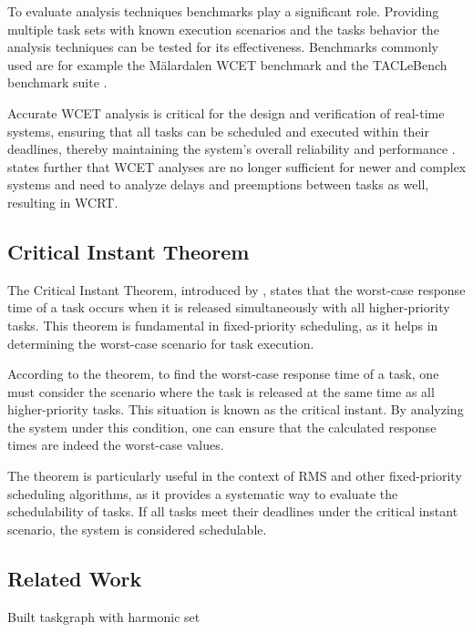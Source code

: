 To evaluate analysis techniques benchmarks play a significant role.
Providing multiple task sets with known execution scenarios and the tasks behavior the analysis techniques can be tested for its effectiveness. 
Benchmarks commonly used are for example the Mälardalen \ac{WCET} benchmark and the TACLeBench benchmark suite \cite{falkTACLeBenchBenchmarkCollection2016}.

Accurate \ac{WCET} analysis is critical for the design and verification of real-time systems, ensuring that all tasks can be scheduled and executed within their deadlines, thereby maintaining the system's overall reliability and performance \cite{kelterWCETAnalysisOptimization}.
\textcite{kelterWCETAnalysisOptimization} states further that \ac{WCET} analyses are no longer sufficient for newer and complex systems and need to analyze delays and preemptions between tasks as well, resulting in \ac{WCRT}.

\subsection{Critical Instant Theorem}
\label{sec:critial_instant_theorem}
The Critical Instant Theorem, introduced by \textcite{liuSchedulingAlgorithmsMultiprogramming1973}, states that the worst-case response time of a task occurs when it is released simultaneously with all higher-priority tasks.
This theorem is fundamental in fixed-priority scheduling, as it helps in determining the worst-case scenario for task execution.

According to the theorem, to find the worst-case response time of a task, one must consider the scenario where the task is released at the same time as all higher-priority tasks. 
This situation is known as the critical instant. By analyzing the system under this condition, one can ensure that the calculated response times are indeed the worst-case values.

The theorem is particularly useful in the context of \ac{RMS} and other fixed-priority scheduling algorithms, as it provides a systematic way to evaluate the schedulability of tasks. 
If all tasks meet their deadlines under the critical instant scenario, the system is considered schedulable.

\subsection{Related Work}
\label{sec:related_work}
\todo{}
\cite{dar-tzenpengAssignmentSchedulingCommunicating1997} Built taskgraph with harmonic set 